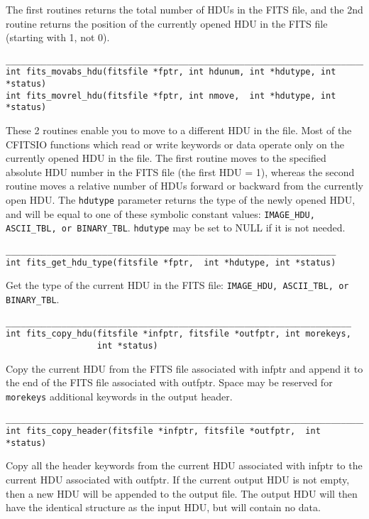 \documentclass[11pt]{article}
\begin{document}
The first routines returns the total number of HDUs in the FITS file,
and the 2nd routine returns the position of the currently opened HDU in
the FITS file (starting with 1, not 0).

\begin{verbatim}
__________________________________________________________________________
int fits_movabs_hdu(fitsfile *fptr, int hdunum, int *hdutype, int *status)
int fits_movrel_hdu(fitsfile *fptr, int nmove,  int *hdutype, int *status)
\end{verbatim}

These 2 routines enable you to move to a different HDU in the file.
Most of the CFITSIO functions which read or write keywords or data
operate only on the currently opened HDU in the file.  The first
routine moves to the specified absolute HDU number in the FITS
file (the first HDU = 1), whereas the second routine moves a relative
number of HDUs forward or backward from the currently open HDU.  The
{\tt hdutype} parameter returns the type of the newly opened HDU, and will
be equal to one of these symbolic constant values: {\tt IMAGE\_HDU,
ASCII\_TBL, or BINARY\_TBL}.  {\tt hdutype} may be set to NULL
if it is not needed.

\begin{verbatim}
_________________________________________________________________
int fits_get_hdu_type(fitsfile *fptr,  int *hdutype, int *status)
\end{verbatim}

Get the type of the current HDU in the FITS file:  {\tt IMAGE\_HDU,
ASCII\_TBL, or BINARY\_TBL}.

\begin{verbatim}
____________________________________________________________________
int fits_copy_hdu(fitsfile *infptr, fitsfile *outfptr, int morekeys,
                  int *status)
\end{verbatim}

Copy the current HDU from the FITS file associated with infptr and
append it to the end of the FITS file associated with outfptr.  Space
may be reserved for {\tt morekeys} additional keywords in the output
header.

\begin{verbatim}
_______________________________________________________________________
int fits_copy_header(fitsfile *infptr, fitsfile *outfptr,  int *status)
\end{verbatim}

Copy all the header keywords from the current HDU associated with
infptr to the current HDU associated with outfptr.  If the current
output HDU is not empty, then a new HDU will be appended to the output
file. The output HDU will then have the identical structure as the
input HDU, but will contain no data.
\end{document}
